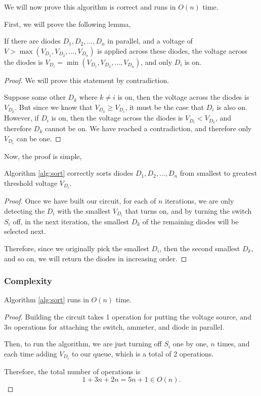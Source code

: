 \documentclass{article}
\begin{document}
We will now prove this algorithm is correct and runs in $O(n)$ time.

First, we will prove the following lemma,

\begin{lemma}
	If there are diodes $D_1, D_2, \dots, D_n$ in parallel, and a voltage of $V
	> \max(V_{D_1}, V_{D_2}, \dots, V_{D_n})$ is applied across these diodes,
	the voltage across the diodes is $V_{D_i} = \min(V_{D_1}, V_{D_2}, \dots, V_{D_n})$,
	and only $D_i$ is on.
\end{lemma}

\begin{proof}
	We will prove this statement by contradiction.

	Suppose some other $D_k$ where $k \neq i$ is on, then the voltage across the diodes is
	$V_{D_k}$. But since we know that $V_{D_k} \geq V_{D_i}$, it must be the case that $D_i$
	is also on. However, if $D_i$ is on, then the voltage across the diodes is $V_{D_i} < V_{D_k}$,
	and therefore $D_k$ cannot be on. We have reached a contradiction, and therefore only $V_{D_i}$
	can be one.
\end{proof}

Now, the proof is simple,

\begin{theorem}
	Algorithm \ref{alg:sort} correctly sorts diodes $D_1, D_2, \dots, D_n$ from
	smallest to greatest threshold voltage $V_{D_i}$.
\end{theorem}
\begin{proof}
	Once we have built our circuit, for each of $n$ iterations, we are only
	detecting the $D_i$ with the smallest $V_{D_i}$ that turns on, and by
	turning the switch $S_i$ off, in the next iteration, the smallest $D_k$ of
	the remaining diodes will be selected next.

	Therefore, since we originally pick the smallest $D_i$, then the second smallest $D_k$, and so on,
	we will return the diodes in increasing order.
\end{proof}

\subsubsection{Complexity}

\begin{theorem}
	Algorithm \ref{alg:sort} runs in $O(n)$ time.
\end{theorem}

\begin{proof}
	Building the circuit takes 1 operation for putting the voltage source, and $3n$ operations for
	attaching the switch, ammeter, and diode in parallel.

	Then, to run the algorithm, we are just turning off $S_i$ one by one, $n$
	times, and each time adding $V_{D_i}$ to our queue, which is a total of 2
	operations.

	Therefore, the total number of operations is
	\begin{equation}
		1 + 3n + 2n = 5n+1 \in O(n).
	\end{equation}
\end{proof}
\end{document}

